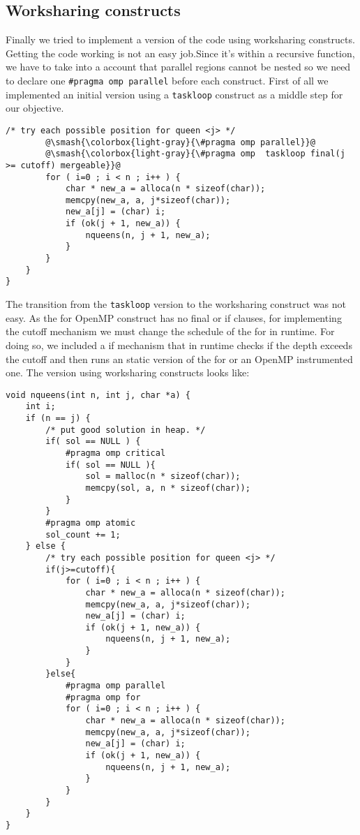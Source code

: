 \subsection{Worksharing constructs}
\justify
Finally we tried to implement a version of the code using worksharing constructs. 
Getting the code working is not an easy job.Since it's within a recursive function, we have to take into a account that parallel regions cannot be nested so we need to declare one \texttt{\#pragma omp parallel} before each construct.
\justify
First of all we implemented an initial version using a \texttt{taskloop} construct as a middle step for our objective.
\begin{lstlisting}[escapechar=@]
		/* try each possible position for queen <j> */
		@\smash{\colorbox{light-gray}{\#pragma omp parallel}}@
		@\smash{\colorbox{light-gray}{\#pragma omp  taskloop final(j >= cutoff) mergeable}}@
		for ( i=0 ; i < n ; i++ ) {
			char * new_a = alloca(n * sizeof(char));
			memcpy(new_a, a, j*sizeof(char));
			new_a[j] = (char) i;
			if (ok(j + 1, new_a)) {
				nqueens(n, j + 1, new_a);
			}
		}
	}
}
\end{lstlisting}
\justify
The transition from the \texttt{taskloop} version to the worksharing construct was not easy. 
\justify
As the for OpenMP construct has no final or if clauses, for implementing the cutoff mechanism we must change the schedule of the for in runtime. For doing so, we included a if mechanism that in runtime checks if the depth exceeds the cutoff and then runs an static version of the for or an OpenMP instrumented one. 
\justify
The version using worksharing constructs looks like:
\begin{lstlisting}
void nqueens(int n, int j, char *a) {
	int i;
	if (n == j) {
		/* put good solution in heap. */
		if( sol == NULL ) {
			#pragma omp critical
			if( sol == NULL ){
				sol = malloc(n * sizeof(char));
				memcpy(sol, a, n * sizeof(char));
			}
		}
		#pragma omp atomic
		sol_count += 1;
	} else {
		/* try each possible position for queen <j> */
        if(j>=cutoff){
            for ( i=0 ; i < n ; i++ ) {
                char * new_a = alloca(n * sizeof(char));
                memcpy(new_a, a, j*sizeof(char));
                new_a[j] = (char) i;
                if (ok(j + 1, new_a)) {
                    nqueens(n, j + 1, new_a);
                }
            }
        }else{
            #pragma omp parallel
            #pragma omp for 
            for ( i=0 ; i < n ; i++ ) {
                char * new_a = alloca(n * sizeof(char));
                memcpy(new_a, a, j*sizeof(char));
                new_a[j] = (char) i;
                if (ok(j + 1, new_a)) {
                    nqueens(n, j + 1, new_a);
                }
            }
        }
    }
}
\end{lstlisting}
